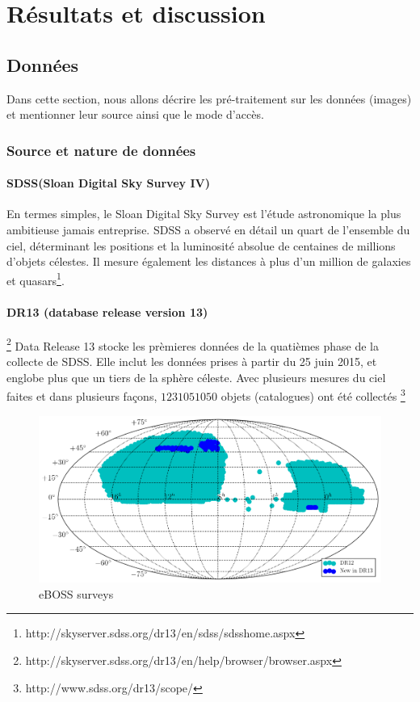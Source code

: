 \chapter{Résultats et discussion}

\section{Données}
Dans cette section, nous allons décrire les pré-traitement sur les données (images) et mentionner leur source ainsi que le mode d'accès.
\subsection{Source et nature de données}

\subsubsection{SDSS(Sloan Digital Sky Survey IV)}
En termes simples, le Sloan Digital Sky Survey est l'étude astronomique la plus ambitieuse jamais entreprise. SDSS a observé en détail un quart de l'ensemble du ciel, déterminant les positions et la luminosité absolue de centaines de millions d'objets célestes\cite{sdss}. Il mesure également les distances à plus d'un million de galaxies et quasars\footnote{http://skyserver.sdss.org/dr13/en/sdss/sdsshome.aspx}. 

\subsubsection{DR13 (database release version 13)} \footnote{http://skyserver.sdss.org/dr13/en/help/browser/browser.aspx}
Data Release 13 stocke les prèmieres données de la quatièmes phase de la collecte de SDSS. Elle inclut les données prises à partir du 25 juin 2015, et englobe plus que un tiers de la sphère céleste. Avec plusieurs mesures du ciel faites et dans plusieurs façons, $1 231 051 050$ objets (catalogues) ont été collectés \footnote{http://www.sdss.org/dr13/scope/} 

\begin{figure}[H]
    \centering
    \includegraphics[scale = 0.5]{images/dr13_boss.png}
    \caption{eBOSS surveys}%
\end{figure}

